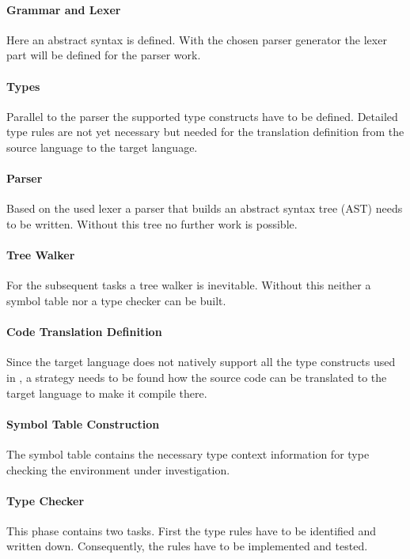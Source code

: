 \paragraph{Grammar and Lexer}
Here an abstract syntax is defined. With the chosen parser generator
the lexer part will be defined for the parser work.

\paragraph{Types}
Parallel to the parser the supported type constructs have to be
defined. Detailed type rules are not yet necessary but needed for the
translation definition from the source language to the target language.

\paragraph{Parser}
Based on the used lexer a parser that builds an abstract syntax tree
(AST) needs to be written. Without this tree no further work is possible.

\paragraph{Tree Walker}
For the subsequent tasks a tree walker is inevitable. Without this
neither a symbol table nor a type checker can be built.

\paragraph{Code Translation Definition}
Since the target language does not natively support all the type
constructs used in \ooplss, a strategy needs to be found
how the source code can be translated to the target language to make it
compile there.

\paragraph{Symbol Table Construction}
The symbol table contains the necessary type context information for
type checking the environment under investigation.

\paragraph{Type Checker}
This phase contains two tasks. First the type rules have to be identified
and written down. Consequently, the rules have to be implemented and tested.

